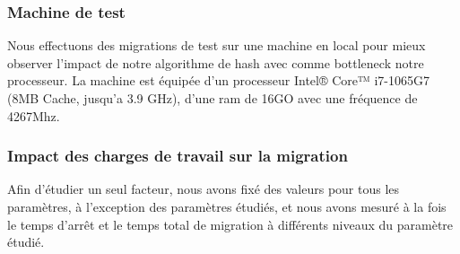 \subsubsection{Machine de test}
Nous effectuons des migrations de test sur une machine en local pour mieux observer l'impact de notre algorithme de hash avec comme bottleneck notre processeur.
La machine est équipée d'un processeur Intel® Core™ i7-1065G7 (8MB Cache, jusqu'a 3.9 GHz), d'une ram de 16GO avec une fréquence de 4267Mhz.

\subsubsection{Impact des charges de travail sur la migration}


Afin d'étudier un seul facteur, nous avons fixé des valeurs pour tous les paramètres, à l'exception des paramètres étudiés, et nous avons mesuré à la fois le temps d'arrêt et le temps total de migration à différents niveaux du paramètre étudié.

